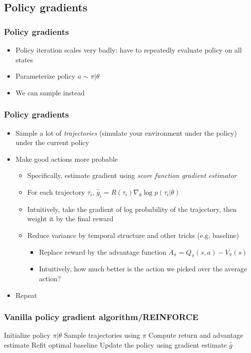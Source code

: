 \documentclass{beamer}
\begin{document}
\subsection{Policy gradients}

\begin{frame}
  \frametitle{Policy gradients}
  \begin{itemize}
    \item Policy iteration scales very badly: have to repeatedly evaluate policy on all states
    \item Parameterize policy $a \sim \pi | \theta$
    \item We can sample instead
  \end{itemize}
\end{frame}
\begin{frame}
  \frametitle{Policy gradients}
  \begin{itemize}
    \item Sample a lot of \textit{trajectories} (simulate your environment under the policy) under the current policy
    \item Make good actions more probable
      \begin{itemize}
        \item Specifically, estimate gradient using \textit{score function gradient estimator}
        \item For each trajectory $\tau_i$, $\hat{g}_i = R(\tau_i) \nabla_\theta \log p(\tau_i|\theta)$
        \item Intuitively, take the gradient of log probability of the trajectory, then weight it by the final reward
        \item Reduce variance by temporal structure and other tricks (e.g. baseline)
          \begin{itemize}
            \item Replace reward by the advantage function $A_\pi = Q_\pi(s,a) - V_\pi(s)$
            \item Intuitively, how much better is the action we picked over the average action?
          \end{itemize}
      \end{itemize}
    \item Repeat
  \end{itemize}
\end{frame}

\begin{frame}
  \frametitle{Vanilla policy gradient algorithm/REINFORCE}
  \begin{algorithmic}
    \State Initialize policy $\pi | \theta$
    \State Sample trajectories using $\pi$
    \State Compute return and advantage estimate
    \EndFor
    \State Refit optimal baseline
    \State Update the policy using gradient estimate $\hat{g}$
    \EndWhile
  \end{algorithmic}
\end{frame}
\end{document}
